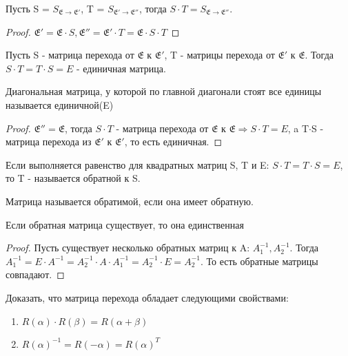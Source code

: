 \begin{proposition}
	Пусть S = \(S_{\mathfrak{E}\to\mathfrak{E'}}\), T = \(S_{\mathfrak{E'}\to\mathfrak{E''}}\), тогда \(S\cdot T = S_{\mathfrak{E}\to\mathfrak{E''}}\).
\end{proposition}
\begin{proof}
	\(\mathfrak{E'} = \mathfrak{E}\cdot S, \mathfrak{E''} = \mathfrak{E'}\cdot T = \mathfrak{E}\cdot S\cdot T\)
\end{proof}
\begin{proposition}
	Пусть S - матрица перехода от \(\mathfrak{E}\) к \(\mathfrak{E'}\), T - матрицы перехода от \(\mathfrak{E'}\) к \(\mathfrak{E}\). Тогда \(S\cdot T = T\cdot S = E\) - единичная матрица.
\end{proposition}
\begin{definition}
	Диагональная матрица, у которой по главной диагонали стоят все единицы называется единичной(E)
\end{definition}
\begin{proof}	
		\(\mathfrak{E''} = \mathfrak{E}\), тогда \(S\cdot T\) - матрица перехода от \(\mathfrak{E}\) к \(\mathfrak{E}\Longrightarrow S\cdot T = E\), a T$\cdot$S - матрица перехода из \(\mathfrak{E'}\) к \(\mathfrak{E'}\), то есть единичная.
\end{proof}
\begin{definition}
	Если выполняется равенство для квадратных матриц S, T и E: \(S\cdot T = T\cdot S = E\), то T - называется обратной к S.
\end{definition}
\begin{definition}
	Матрица называется обратимой, если она имеет обратную.
\end{definition}
\begin{proposition}
	Если обратная матрица существует, то она единственная
\end{proposition}
\begin{proof}
	Пусть существует несколько обратных матриц к A: \(A_1^{-1}, A_2^{-1}\). Тогда \(A_1^{-1} = E\cdot A^{-1} = A_2^{-1}\cdot A\cdot A_1^{-1} = A_2^{-1}\cdot E = A_2^{-1}\). То есть обратные матрицы совпадают.
\end{proof}
\begin{exercise}
	Доказать, что матрица перехода обладает следующими свойствами:
	\begin{enumerate}
		\item \(R(\alpha)\cdot R(\beta) = R(\alpha+\beta)\)
		\item \(R(\alpha)^{-1} = R(-\alpha)=R(\alpha)^T\)
	\end{enumerate}
\end{exercise}
